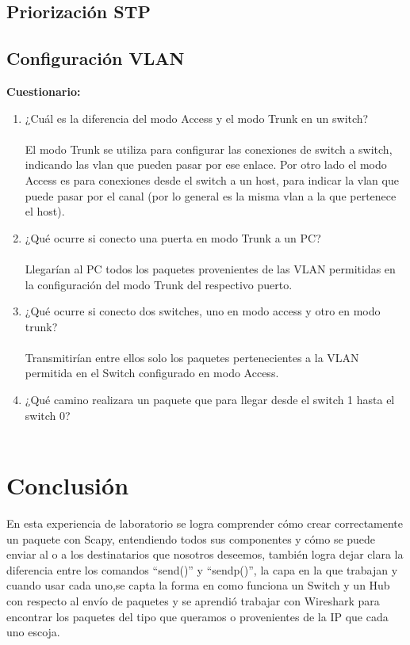 \documentclass{udpreport}
\begin{document}
	\section{Priorización STP}
	
	\section{Configuración VLAN}
	
	{\large \bf{Cuestionario: }}\\
	\begin{enumerate}
	    \item ¿Cuál es la diferencia del modo Access y el modo Trunk en un switch?\\\\
	         El modo Trunk se utiliza para configurar las conexiones de switch a switch, indicando las vlan que pueden pasar por ese enlace. Por otro lado el modo Access es para conexiones desde el switch a un host, para indicar la vlan que puede pasar por el canal (por lo general es la misma vlan a la que pertenece el host).
        \item  ¿Qué ocurre si conecto una puerta en modo Trunk a un PC?\\\\
            Llegarían al PC todos los paquetes provenientes de las VLAN permitidas en la configuración del modo Trunk del respectivo puerto.
        \item ¿Qué ocurre si conecto dos switches, uno en modo access y otro en modo trunk?\\\\
              Transmitirían entre ellos solo los paquetes pertenecientes a la VLAN 
  	      permitida en el Switch configurado en modo Access.
  	     \item  ¿Qué camino realizara un paquete que para llegar desde el switch 1 hasta el switch 0?\\\\
  	     
	\end{enumerate}
\chapter{Conclusión}
  	      En esta experiencia de laboratorio se logra comprender cómo crear correctamente un paquete con Scapy,
  	      entendiendo todos sus componentes y cómo se puede enviar al o a los destinatarios que nosotros deseemos, también
  	      logra dejar clara la diferencia entre los comandos “send()” y “sendp()”, la capa en la que trabajan y cuando usar cada
  	      uno,se capta la forma en como funciona un Switch y un Hub con respecto al envío de paquetes y se aprendió trabajar con
  	      Wireshark para encontrar los paquetes del tipo que queramos o provenientes de la IP que cada uno  escoja.
  	      
\end{document}
